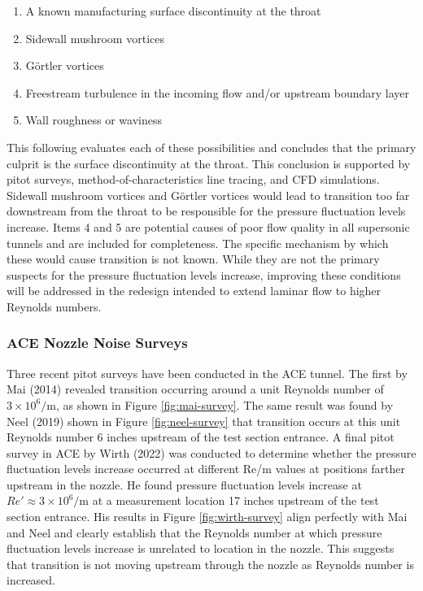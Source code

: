 \begin{enumerate}
    \item A known manufacturing surface discontinuity at the throat
    \item Sidewall mushroom vortices
    \item Görtler vortices
    \item Freestream turbulence in the incoming flow and/or upstream boundary layer
    \item Wall roughness or waviness
\end{enumerate}

This following evaluates each of these possibilities and concludes that the primary culprit is the surface discontinuity at the throat. This conclusion is supported by pitot surveys, method-of-characteristics line tracing, and CFD simulations. Sidewall mushroom vortices and Görtler vortices would lead to transition too far downstream from the throat to be responsible for the pressure fluctuation levels increase. Items 4 and 5 are potential causes of poor flow quality in all supersonic tunnels and are included for completeness. The specific mechanism by which these would cause transition is not known. While they are not the primary suspects for the pressure fluctuation levels increase, improving these conditions will be addressed in the redesign intended to extend laminar flow to higher Reynolds numbers.

\subsubsection*{ACE Nozzle Noise Surveys}

Three recent pitot surveys have been conducted in the ACE tunnel. The first by Mai (2014) revealed transition occurring around a unit Reynolds number of $3 \times 10^6/\mathrm{m}$, as shown in Figure \ref{fig:mai-survey}. The same result was found by Neel (2019) shown in Figure \ref{fig:neel-survey} that transition occurs at this unit Reynolds number 6 inches upstream of the test section entrance. A final pitot survey in ACE by Wirth (2022) was conducted to determine whether the pressure fluctuation levels increase occurred at different Re/m values at positions farther upstream in the nozzle. He found pressure fluctuation levels increase at $Re' \approx 3 \times 10^6/\mathrm{m}$ at a measurement location 17 inches upstream of the test section entrance. His results in Figure \ref{fig:wirth-survey} align perfectly with Mai and Neel and clearly establish that the Reynolds number at which pressure fluctuation levels increase is unrelated to location in the nozzle. This suggests that transition is not moving upstream through the nozzle as Reynolds number is increased.

